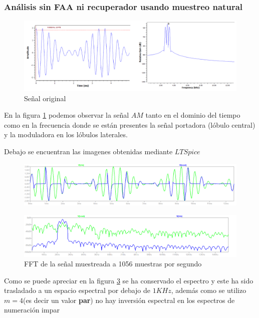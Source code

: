 \subsubsection{Análisis sin FAA ni recuperador usando muestreo natural}
\begin{figure}[H]
	\centering
	\includegraphics[width=\linewidth]{ImagenesEjercicio8/input}
	\caption{Señal original}
	\label{fig:input}
\end{figure}
En la figura \ref{fig:input} podemos observar la señal $AM$ tanto en el dominio del tiempo como en la frecuencia donde se están presentes la señal portadora (lóbulo central) y la moduladora en los lóbulos laterales.

Debajo se encuentran las imagenes obtenidas mediante $LTSpice$
\begin{figure}[H]
	\centering
	\includegraphics[width=\linewidth]{ImagenesEjercicio8/MuestreoNatural1056time.png}
	\caption{}
	\label{fig:muestreonatural1056time}
\end{figure}
\begin{figure}[H]
	\centering
	\includegraphics[width=\linewidth]{ImagenesEjercicio8/FFT1056_MuestreoNatural.png}
	\caption{FFT de la señal muestreada a 1056 muestras por segundo}
	\label{fig:FFT_muestreonatural1056time}
\end{figure}
Como se puede apreciar en la figura \ref{fig:FFT_muestreonatural1056time} se ha conservado el espectro y este ha sido trasladado a un espacio espectral por debajo de $1KHz$, además como se utilizo $m=4$(es decir un valor \textbf{par}) no hay inversión espectral en los espectros de numeración impar

